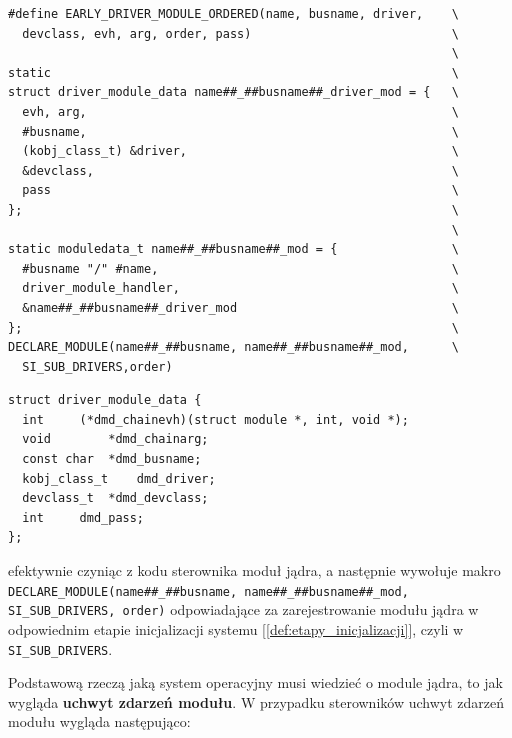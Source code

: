 \documentclass[shortabstract,inz]{iithesis}
\begin{document}
\begin{lstlisting}[caption=Makro EARLY\_DRIVER\_MODULE\_ORDERED]
#define EARLY_DRIVER_MODULE_ORDERED(name, busname, driver,    \
  devclass, evh, arg, order, pass)                            \
                                                              \
static                                                        \
struct driver_module_data name##_##busname##_driver_mod = {   \
  evh, arg,                                                   \
  #busname,                                                   \
  (kobj_class_t) &driver,                                     \
  &devclass,                                                  \
  pass                                                        \
};                                                            \
                                                              \
static moduledata_t name##_##busname##_mod = {                \
  #busname "/" #name,                                         \
  driver_module_handler,                                      \
  &name##_##busname##_driver_mod                              \
};                                                            \
DECLARE_MODULE(name##_##busname, name##_##busname##_mod,      \
  SI_SUB_DRIVERS,order)
\end{lstlisting}

\begin{lstlisting}[caption=Definicja struktury driver\_module\_data]
struct driver_module_data {
  int     (*dmd_chainevh)(struct module *, int, void *);
  void        *dmd_chainarg;
  const char  *dmd_busname;
  kobj_class_t    dmd_driver;
  devclass_t  *dmd_devclass;
  int     dmd_pass;
};
\end{lstlisting}

efektywnie czyniąc z kodu sterownika moduł jądra, a następnie wywołuje makro
\texttt{DECLARE\_MODULE(name\#\#\_\#\#busname, name\#\#\_\#\#busname\#\#\_mod, SI\_SUB\_DRIVERS, order)}
odpowiadające za zarejestrowanie modułu jądra w odpowiednim etapie inicjalizacji 
systemu [\ref{def:etapy_inicjalizacji}], czyli w \texttt{SI\_SUB\_DRIVERS}.


Podstawową rzeczą jaką system operacyjny musi wiedzieć o module jądra, to
jak wygląda \textbf{uchwyt zdarzeń modułu}.
W przypadku sterowników uchwyt zdarzeń modułu wygląda następująco:
\end{document}
